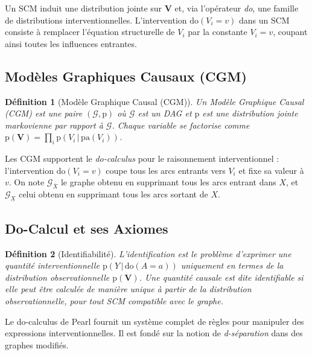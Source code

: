 \documentclass[11pt,a4paper]{article}
\newcommand{\rmdo}{\mathrm{do}}
\newcommand{\g}{\,\vert\,}
\newcommand{\pa}{\mathrm{pa}}
\newcommand{\pr}{\mathrm{p}}
\newtheorem{definition}{Définition}
\begin{document}
Un SCM induit une distribution jointe sur $\mathbf{V}$ et, via l'opérateur \emph{do}, une famille de distributions interventionnelles.
L'intervention $\rmdo(V_i = v)$ dans un SCM consiste à remplacer l'équation structurelle de $V_i$ par la constante $V_i = v$, coupant ainsi toutes les influences entrantes.

\subsection{Modèles Graphiques Causaux (CGM)}

\begin{definition}[Modèle Graphique Causal (CGM)]
Un Modèle Graphique Causal (CGM) est une paire $(\mathcal{G}, \pr)$ où $\mathcal{G}$ est un DAG et $\pr$ est une distribution jointe markovienne par rapport à $\mathcal{G}$.
Chaque variable se factorise comme $\pr(\mathbf{V}) = \prod_i \pr(V_i \g \pa(V_i))$.
\end{definition}

Les CGM supportent le \emph{do-calculus} pour le raisonnement interventionnel : l'intervention $\rmdo(V_i = v)$ coupe tous les arcs entrants vers $V_i$ et fixe sa valeur à $v$.
On note $\mathcal{G}_{\overline{X}}$ le graphe obtenu en supprimant tous les arcs entrant dans $X$, et $\mathcal{G}_{\underline{X}}$ celui obtenu en supprimant tous les arcs sortant de $X$.

\subsection{Do-Calcul et ses Axiomes}
\label{sec:do_calculus}

\begin{definition}[Identifiabilité]
L'\emph{identification} est le problème d'exprimer une quantité interventionnelle $\pr(Y \g \rmdo(A = a))$ uniquement en termes de la distribution observationnelle $\pr(\mathbf{V})$.
Une quantité causale est dite \emph{identifiable} si elle peut être calculée de manière unique à partir de la distribution observationnelle, pour tout SCM compatible avec le graphe.
\end{definition}

Le do-calculus de Pearl \citep{Pearl2009} fournit un système complet de règles pour manipuler des expressions interventionnelles.
Il est fondé sur la notion de \emph{d-séparation} dans des graphes modifiés.
\end{document}
